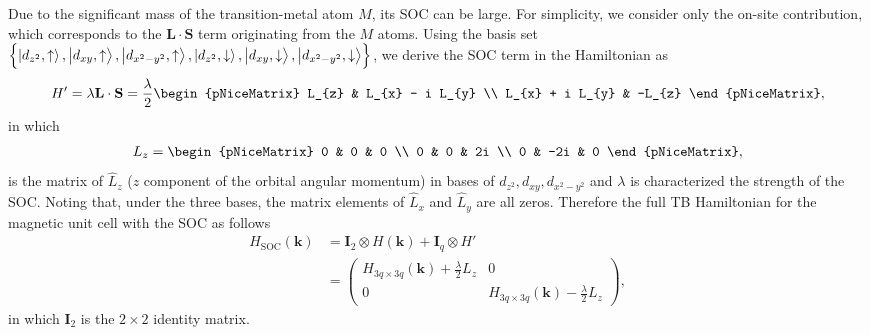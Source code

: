 \documentclass{report}
\newcommand{\f}[2]{\dfrac{#1}{#2}}
\begin{document}
Due to the significant mass of the transition-metal atom $M$, its \ac{SOC} can be large. For simplicity, we consider only the on-site contribution, which corresponds to the $\mathbf{L \cdot S}$ term originating from the $M$ atoms. Using the basis set $\left\{\ket{d_{z^{2}},\uparrow},\ket{d_{xy},\uparrow},\ket{d_{x^{2} - y^{2}},\uparrow},\ket{d_{z^{2}},\downarrow},\ket{d_{xy},\downarrow},\ket{d_{x^{2} - y^{2}},\downarrow}\right\}$, we derive the SOC term in the Hamiltonian as
\begin{gather}
	H{'}
	= \lambda \mathbf{L \cdot S}
	= \f{\lambda}{2}
	\begin{pNiceMatrix}
		L_{z}           & L_{x} - i L_{y} \\
		L_{x} + i L_{y} & -L_{z}
	\end{pNiceMatrix},
\end{gather}
in which
\begin{gather}
	L_{z}
	=
	\begin{pNiceMatrix}
		0 & 0   & 0  \\
		0 & 0   & 2i \\
		0 & -2i & 0
	\end{pNiceMatrix},
\end{gather}
is the matrix of $\hat{L}_{z}$ ($z$ component of the orbital angular momentum) in bases of $d_{z^{2}},d_{xy},d_{x^{2} - y^{2}}$ and $\lambda$ is characterized the strength of the \ac{SOC}. Noting that, under the three bases, the matrix elements of $\hat{L}_{x}$ and $\hat{L}_{y}$ are all zeros. Therefore the full \ac{TB} Hamiltonian for the magnetic unit cell with the SOC as follows
\begin{equation}
	\begin{aligned}
		H_{\text{SOC}}(\mathbf{k})
		 & = \mathbf{I}_{2} \otimes H(\mathbf{k}) + \mathbf{I}_{q} \otimes H{'} \\
		 & =
		\begin{pmatrix}
			H_{3q \times 3q}(\mathbf{k}) + \frac{\lambda}{2} L_{z} & 0                                                      \\
			0                                                      & H_{3q \times 3q}(\mathbf{k}) - \frac{\lambda}{2} L_{z}
		\end{pmatrix},
	\end{aligned}
\end{equation}
in which $\mathbf{I}_{2}$ is the $2\times 2$ identity matrix.
\end{document}
